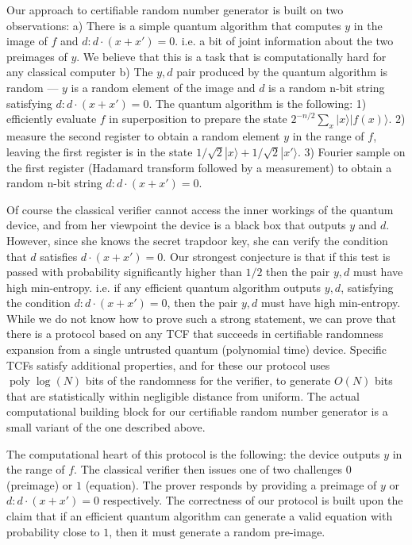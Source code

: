\documentclass[11pt]{article}
\theoremstyle{remark}
\theoremstyle{definition}
\newcommand{\ket}[1]{|#1\rangle}
\DeclareMathOperator{\poly}{poly}
\begin{document}
Our approach to certifiable random number generator is built on two observations: a) There is a simple quantum algorithm that 
computes $y$ in the image of $f$ and $d: d\cdot(x + x') = 0$. i.e. a bit of joint information about the two preimages of $y$. We 
believe that this is a task that is computationally hard for any classical computer b) The $y, d$ pair  produced by the quantum 
algorithm is random --- $y$ is a random element of the image and $d$ is a random n-bit string satisfying $d: d\cdot(x + x') = 0$.
The quantum algorithm is the following: 1) efficiently evaluate $f$ in superposition to prepare the state $2^{-n/2}\sum_x \ket{x}\ket{f(x)}$. 2) measure the second register to obtain a random element $y$ in the range of $f$, leaving the first register 
is in the state $1/\sqrt{2}\ket{x} + 1/\sqrt{2}\ket{x'}$. 3) Fourier sample on the first register (Hadamard transform followed by a measurement) to obtain a random n-bit string 
$d: d\cdot(x + x') = 0$.

Of course the classical verifier cannot access the inner workings of the quantum device, and from her viewpoint the device is a black box that outputs $y$ and $d$. However, since she knows the secret trapdoor key, she can verify the condition that $d$ satisfies $d\cdot(x + x') = 0$. 
Our strongest conjecture is that if this test is passed with probability significantly higher than $1/2$ then the pair $y,d$ must have 
high min-entropy. i.e. if any efficient quantum algorithm outputs $y, d$, satisfying the condition $d: d\cdot(x + x') = 0$, then the pair $y,d$ must have high min-entropy.
While we do not know how to prove such a strong statement, we can prove that there is a 
protocol based on any TCF
that succeeds in certifiable randomness expansion from a single untrusted quantum (polynomial time) device. Specific TCFs 
satisfy additional properties, and for these our protocol uses $\poly\log(N)$ bits of the randomness for the verifier, to 
generate $O(N)$ bits that are statistically within negligible distance from uniform. The actual computational building block 
for our certifiable random number generator is a small variant of the one described above. 

The computational heart of this protocol is the following: the device outputs $y$ in the range of $f$. The classical verifier then issues one of 
two challenges $0$ (preimage) or $1$ (equation). The prover responds by providing a preimage of $y$ or  $d: d\cdot(x + x') = 0$ respectively. 
The correctness of our protocol is built upon the claim that if an efficient quantum algorithm can generate a valid equation with probability close to $1$, then it must generate a random pre-image.
\end{document}
